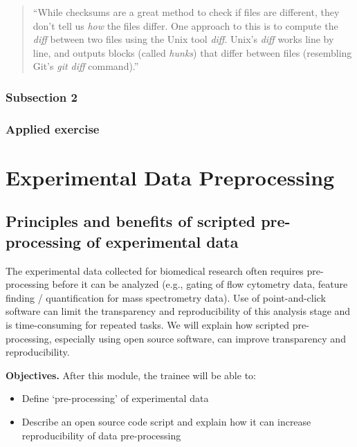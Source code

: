\documentclass[]{tufte-book}
\providecommand{\tightlist}{%
  \setlength{\itemsep}{0pt}\setlength{\parskip}{0pt}}
\begin{document}
\begin{quote}
``While checksums are a great method to check if files are different, they don't tell
us \emph{how} the files differ. One approach to this is to compute the \emph{diff} between
two files using the Unix tool \emph{diff}. Unix's \emph{diff} works line by line, and outputs
blocks (called \emph{hunks}) that differ between files (resembling Git's \emph{git diff} command).''
\citep{buffalo2015bioinformatics}
\end{quote}

\hypertarget{subsection-2-5}{%
\subsection{Subsection 2}\label{subsection-2-5}}

\hypertarget{applied-exercise-3}{%
\subsection{Applied exercise}\label{applied-exercise-3}}

\hypertarget{experimental-data-preprocessing}{%
\chapter{Experimental Data Preprocessing}\label{experimental-data-preprocessing}}

\hypertarget{principles-and-benefits-of-scripted-pre-processing-of-experimental-data}{%
\section{Principles and benefits of scripted pre-processing of experimental data}\label{principles-and-benefits-of-scripted-pre-processing-of-experimental-data}}

The experimental data collected for biomedical research often requires
pre-processing before it can be analyzed (e.g., gating of flow cytometry data,
feature finding / quantification for mass spectrometry data). Use of
point-and-click software can limit the transparency and reproducibility of this
analysis stage and is time-consuming for repeated tasks. We will explain how
scripted pre-processing, especially using open source software, can improve
transparency and reproducibility.

\textbf{Objectives.} After this module, the trainee will be able to:

\begin{itemize}
\tightlist
\item
  Define `pre-processing' of experimental data
\item
  Describe an open source code script and explain how it can increase
  reproducibility of data pre-processing
\end{itemize}
\end{document}
